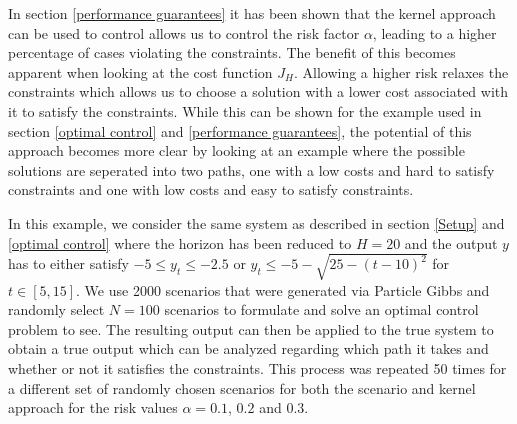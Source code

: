 In section \ref{performance guarantees} it has been shown that the kernel approach can be used to control allows us to control the risk factor $\alpha$, leading to a higher percentage of cases violating the constraints. The benefit of this becomes apparent when looking at the cost function $J_H$. Allowing a higher risk relaxes the constraints which allows us to choose a solution with a lower cost associated with it to satisfy the constraints. While this can be shown for the example used in section \ref{optimal control} and \ref{performance guarantees}, the potential of this approach becomes more clear by looking at an example where the possible solutions are seperated into two paths, one with a low costs and hard to satisfy constraints and one with low costs and easy to satisfy constraints.

In this example, we consider the same system as described in section \ref{Setup} and \ref{optimal control} where the horizon has been reduced to $H = 20$ and the output $y$ has to either satisfy $-5 \leq y_t \leq -2.5$ or $y_t \leq -5 - \sqrt{25- (t - 10)^2}$ for $t \in [5, 15]$. We use 2000 scenarios that were generated via Particle Gibbs and randomly select $N = 100$ scenarios to formulate and solve an optimal control problem to see. The resulting output can then be applied to the true system to obtain a true output which can be analyzed regarding which path it takes and whether or not it satisfies the constraints. This process was repeated 50 times for a different set of randomly chosen scenarios for both the scenario and kernel approach for the risk values $\alpha = 0.1$, $0.2$ and $0.3$.


